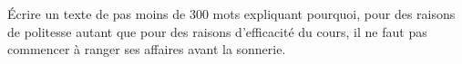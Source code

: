 
\begin{exercice}\label{exosmath-0427}

    Écrire un texte de pas moins de 300 mots expliquant pourquoi, pour des raisons de politesse autant que pour des raisons d'efficacité du cours, il ne faut pas commencer à ranger ses affaires avant la sonnerie.

\end{exercice}
